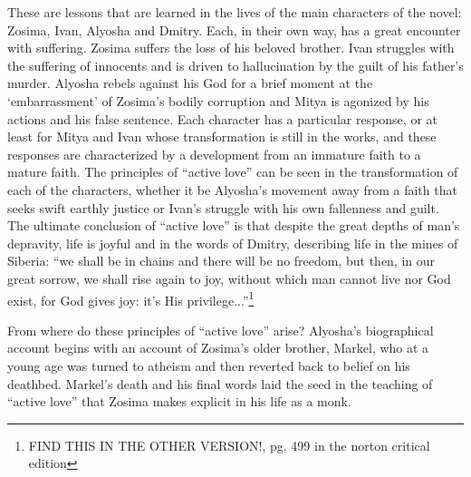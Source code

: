 These are lessons that are learned in the lives of the main characters of the novel: Zosima, Ivan, Alyosha and Dmitry. Each, in their own way, has a great encounter with suffering. Zosima suffers the loss of his beloved brother. Ivan struggles with the suffering of innocents and is driven to hallucination by the guilt of his father's murder. Alyosha rebels against his God for a brief moment at the `embarrassment' of Zosima's bodily corruption and Mitya is agonized by his actions and his false sentence. Each character has a particular response, or at least for Mitya and Ivan whose transformation is still in the works, and these responses are characterized by a development from an immature faith to a mature faith. The principles of ``active love'' can be seen in the transformation of each of the characters, whether it be Alyosha's movement away from a faith that seeks swift earthly justice or Ivan's struggle with his own fallenness and guilt. The ultimate conclusion of ``active love'' is that despite the great depths of man's depravity, life is joyful and in the words of Dmitry, describing life in the mines of Siberia: ``we shall be in chains and there will be no freedom, but then, in our great sorrow, we shall rise again to joy, without which man cannot live nor God exist, for God gives joy: it's His privilege...''\footnote{FIND THIS IN THE OTHER VERSION!, pg. 499 in the norton critical edition}

From where do these principles of ``active love'' arise? Alyosha's biographical account begins with an account of Zosima's older brother, Markel, who at a young age was turned to atheism and then reverted back to belief on his deathbed. Markel's death and his final words laid the seed in the teaching of ``active love'' that Zosima makes explicit in his life as a monk.

